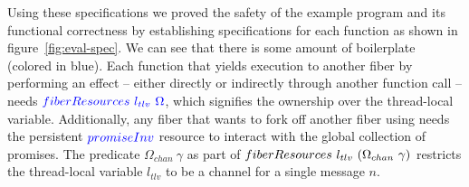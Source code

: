 Using these specifications we proved the safety of the example program and its functional correctness by establishing specifications for each function as shown in figure~\ref{fig:eval-spec}.
We can see that there is some amount of boilerplate (colored in {\color{blue} blue}).
Each function that yields execution to another fiber by performing an effect -- either directly or indirectly through another function call -- needs \({\color{blue}fiberResources~l_{tlv}~\Omega}\), which signifies the ownership over the thread-local variable.
Additionally, any fiber that wants to fork off another fiber using  needs the persistent \({\color{blue}promiseInv{}}\) resource to interact with the global collection of promises.
The predicate \(\Omega_{chan}~\gamma\) as part of \(fiberResources~l_{tlv}~(\Omega_{chan}~\gamma)\) restricts the thread-local variable \(l_{tlv}\) to be a channel for a single message \(n\).

